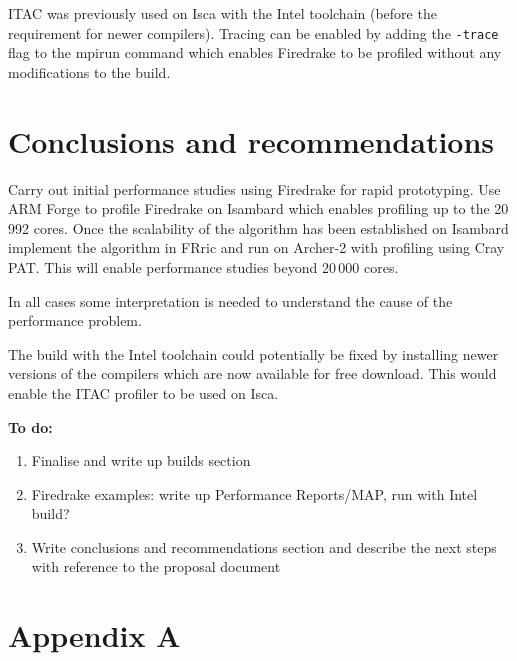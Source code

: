 \documentclass[a4paper,titlepage]{article}
\begin{document}
ITAC was previously used on Isca with the Intel toolchain (before the requirement for newer compilers). Tracing can be enabled by adding the \verb+-trace+ flag to the mpirun command which enables Firedrake to be profiled without any modifications to the build. 



\section{Conclusions and recommendations}
\label{section:conclusions}

Carry out initial performance studies using Firedrake for rapid prototyping. Use ARM Forge to profile Firedrake on Isambard which enables profiling up to the 20\,992 cores. Once the scalability of the algorithm has been established on Isambard implement the algorithm in FRric and run on Archer-2 with profiling using Cray PAT. This will enable performance studies beyond 20\,000 cores.

In all cases some interpretation is needed to understand the cause of the performance problem. 

The build with the Intel toolchain could potentially be fixed by installing newer versions of the compilers which are now available for free download. This would enable the ITAC profiler to be used on Isca.

\noindent
\textbf{To do:}

\begin{enumerate}
\item Finalise and write up builds section
\item Firedrake examples: write up Performance Reports/MAP, run with Intel build?
\item Write conclusions and recommendations section and describe the next steps with reference to the proposal document
\end{enumerate}

\pagebreak


\section*{Appendix A}
\label{appendixA}

\end{document}
